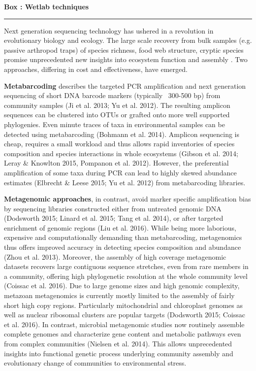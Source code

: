 \documentclass[12pt]{article}
\newcounter{Box}
\begin{document}
\noindent
\colorbox{gray!20}{
  \begin{minipage}{0.97\textwidth}
    \label{box:wet}
    \noindent
    {\bf \large Box \theBox: Wetlab techniques} 
    \vspace{1pt}
    \hrule
    \vspace{1pt}
    
    Next generation sequencing technology has ushered in a revolution
    in evolutionary biology and ecology. The large scale recovery from
    bulk samples (e.g. passive arthropod traps) of species richness,
    food web structure, cryptic species promise unprecedented new
    insights into ecosystem function and assembly
    \citep{krehenwinkel2016, shokralla2015, gibson2014, taberlet2012}.
    Two approaches, differing in cost and effectiveness, have emerged.

    {\bf Metabarcoding} describes the targeted PCR amplification and
    next generation sequencing of short DNA barcode markers (typically
    ~300-500 bp) from community samples (Ji et al. 2013; Yu et
    al. 2012). The resulting amplicon sequences can be clustered into
    OTUs or grafted onto more well supported phylogenies. Even minute
    traces of taxa in environmental samples can be detected using
    metabarcoding (Bohmann et al. 2014). Amplicon sequencing is cheap,
    requires a small workload and thus allows rapid inventories of
    species composition and species interactions in whole ecosystems
    (Gibson et al. 2014; Leray \& Knowlton 2015, Pompanon et
    al. 2012). However, the preferential amplification of some taxa
    during PCR can lead to highly skewed abundance estimates (Elbrecht
    \& Leese 2015; Yu et al. 2012) from metabarcoding libraries.

    {\bf Metagenomic approaches}, in contrast, avoid marker specific
    amplification bias by sequencing libraries constructed either from
    untreated genomic DNA (Dodsworth 2015; Linard et al. 2015; Tang et
    al. 2014), or after targeted enrichment of genomic regions (Liu et
    al. 2016). While being more laborious, expensive and
    computationally demanding than metabarcoding, metagenomics thus
    offers improved accuracy in detecting species composition and
    abundance (Zhou et al. 2013). Moreover, the assembly of high
    coverage metagenomic datasets recovers large contiguous sequence
    stretches, even from rare members in a community, offering high
    phylogenetic resolution at the whole community level (Coissac et
    al. 2016). Due to large genome sizes and high genomic complexity,
    metazoan metagenomics is currently mostly limited to the assembly
    of fairly short high copy regions. Particularly mitochondrial and
    chloroplast genomes as well as nuclear ribosomal clusters are
    popular targets (Dodsworth 2015; Coissac et al. 2016). In
    contrast, microbial metagenomic studies now routinely assemble
    complete genomes and characterize gene content and metabolic
    pathways even from complex communities (Nielsen et al. 2014). This
    allows unprecedented insights into functional genetic process
    underlying community assembly and evolutionary change of
    communities to environmental stress.


\end{minipage}}
\end{document}
